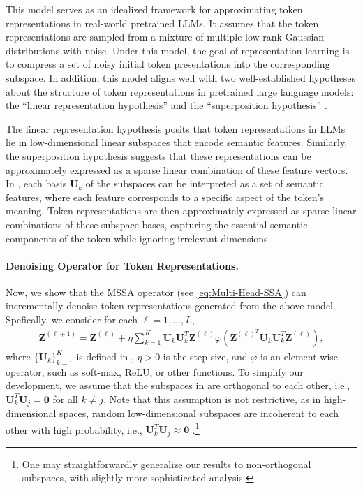 \documentclass[\toplevelprefix/book-main.tex]{subfiles}
\begin{document}
This model serves as an idealized framework for approximating token representations in real-world pretrained LLMs. It assumes that the token representations are sampled from a mixture of multiple low-rank Gaussian distributions with noise. Under this model, the goal of representation learning is to compress a set of noisy initial token presentations into the corresponding subspace. In addition, this model aligns well with two well-established hypotheses about the structure of token representations in pretrained large language models: the ``linear representation hypothesis''  \citep{jiang2024origins,park2023linear} and the ``superposition hypothesis'' \citep{elhage2022toy,yun2021transformer}. 

\begin{remark}
    The linear representation hypothesis posits that token representations in LLMs lie in low-dimensional linear subspaces that encode semantic features. Similarly, the superposition hypothesis suggests that these representations can be approximately expressed as a sparse linear combination of these feature vectors. In , each basis $\bm U_k$ of the subspaces can be interpreted as a set of semantic features, where each feature corresponds to a specific aspect of the token's meaning. Token representations are then approximately expressed as sparse linear combinations of these subspace bases, capturing the essential semantic components of the token while ignoring irrelevant dimensions. 
\end{remark}

\paragraph{Denoising Operator for Token Representations.} Now, we show that the MSSA operator (see \eqref{eq:Multi-Head-SSA}) can incrementally denoise token representations generated from the above model. Spefically, we consider for each $\ell =1 ,\dots,L$, 
\begin{align}\label{eq:MSSA}
    \bm Z^{(\ell+1)} =  \bm Z^{(\ell)} + \eta \sum_{k=1}^K \bm U_k\bm U_k^T \bm Z^{(\ell)} \varphi \left(\bm Z^{(\ell)^T}\bm U_k\bm U_k^T\bm Z^{(\ell)} \right),
\end{align}
where $\{\bm U_k\}_{k=1}^K$ is defined in , $\eta > 0$ is the step size, and $\varphi$ is an element-wise operator, such as soft-max, ReLU, or other functions. To simplify our development, we assume that the subspaces in  are orthogonal to each other, i.e., $\bm U_k^T\bm U_j = \bm 0$ for all $k \neq j$. Note that this assumption is not restrictive, as in high-dimensional spaces, random low-dimensional subspaces are incoherent to each other with high probability, i.e., $\bm U_k^T\bm U_j \approx \bm 0$ \citep{Wright-Ma-2021}.\footnote{One may straightforwardly generalize our results to non-orthogonal subspaces, with slightly more sophisticated analysis.}   
\end{document}
